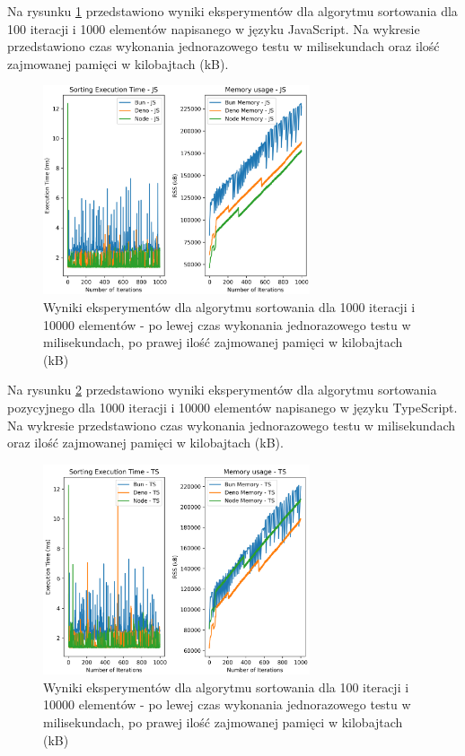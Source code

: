 Na rysunku \ref{fig:radix_sorting_e4} przedstawiono wyniki eksperymentów dla algorytmu sortowania  dla 100 iteracji i 1000 elementów napisanego w języku JavaScript. Na wykresie przedstawiono czas wykonania jednorazowego testu w milisekundach oraz ilość zajmowanej pamięci w kilobajtach (kB).

\begin{figure}[H]
  \centering
  \includegraphics[width=0.7\textwidth]{Figures/sorting/sorting_radix_1000_10000_js.png}
  \caption{Wyniki eksperymentów dla algorytmu sortowania  dla 1000 iteracji i 10000 elementów - po lewej czas wykonania jednorazowego testu w milisekundach, po prawej ilość zajmowanej pamięci w kilobajtach (kB)}
  \label{fig:radix_sorting_e4}
\end{figure}

Na rysunku \ref{fig:radix_sorting_e4_ts} przedstawiono wyniki eksperymentów dla algorytmu sortowania pozycyjnego dla 1000 iteracji i 10000 elementów napisanego w języku TypeScript. Na wykresie przedstawiono czas wykonania jednorazowego testu w milisekundach oraz ilość zajmowanej pamięci w kilobajtach (kB).

\begin{figure}[H]
  \centering
  \includegraphics[width=0.7\textwidth]{Figures/sorting/sorting_radix_1000_10000_ts.png}
  \caption{Wyniki eksperymentów dla algorytmu sortowania  dla 100 iteracji i 10000 elementów - po lewej czas wykonania jednorazowego testu w milisekundach, po prawej ilość zajmowanej pamięci w kilobajtach (kB)}
  \label{fig:radix_sorting_e4_ts}
\end{figure}

